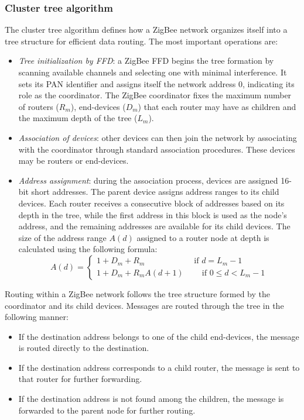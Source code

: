 \subsubsection{Cluster tree algorithm}
The cluster tree algorithm defines how a ZigBee network organizes itself into a tree structure for efficient data routing.
The most important operations are: 
\begin{itemize}
    \item \textit{Tree initialization by FFD}: a ZigBee FFD begins the tree formation by scanning available channels and selecting one with minimal interference. 
        It sets its PAN identifier and assigns itself the network address 0, indicating its role as the coordinator.
        The ZigBee coordinator fixes the maximum number of routers ($R_m$), end-devices ($D_m$) that each router may have as children and the maximum depth of the tree ($L_m$).
    \item \textit{Association of devices}: other devices can then join the network by associating with the coordinator through standard association procedures. 
        These devices may be routers or end-devices.
    \item \textit{Address assignment}: during the association process, devices are assigned 16-bit short addresses. 
        The parent device assigns address ranges to its child devices. 
        Each router receives a consecutive block of addresses based on its depth in the tree, while the first address in this block is used as the node's address, and the remaining addresses are available for its child devices.
        The size of the address range $A(d)$ assigned to a router node at depth is calculated using the following formula:
        \[A(d)=\begin{cases} 1+D_m+R_m\qquad\qquad\qquad\text{if }d=L_m-1 \\ 1+D_m+R_mA(d+1)\:\qquad\text{if }0 \leq d <L_m-1 \end{cases}\]
\end{itemize}
Routing within a ZigBee network follows the tree structure formed by the coordinator and its child devices. 
Messages are routed through the tree in the following manner:
\begin{itemize}
    \item If the destination address belongs to one of the child end-devices, the message is routed directly to the destination.
    \item If the destination address corresponds to a child router, the message is sent to that router for further forwarding.
    \item If the destination address is not found among the children, the message is forwarded to the parent node for further routing.
\end{itemize}


